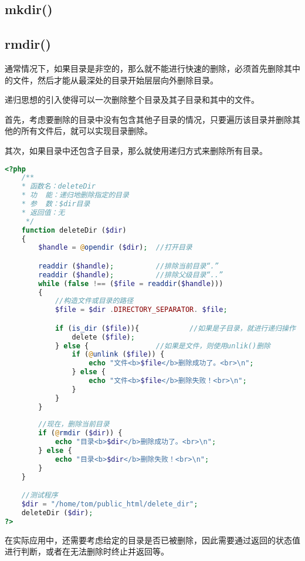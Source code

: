 \subsection{mkdir()}




\subsection{rmdir()}


通常情况下，如果目录是非空的，那么就不能进行快速的删除，必须首先删除其中的文件，然后才能从最深处的目录开始层层向外删除目录。


递归思想的引入使得可以一次删除整个目录及其子目录和其中的文件。


首先，考虑要删除的目录中没有包含其他子目录的情况，只要遍历该目录并删除其他的所有文件后，就可以实现目录删除。

其次，如果目录中还包含子目录，那么就使用递归方式来删除所有目录。



\begin{lstlisting}[language=PHP]
<?php
	/**
	* 函数名：deleteDir
	* 功  能：递归地删除指定的目录
	* 参  数：$dir目录
	* 返回值：无
     */
	function deleteDir ($dir)
	{
		$handle = @opendir ($dir);	//打开目录

		readdir ($handle);			//排除当前目录“.”
		readdir ($handle);			//排除父级目录“..”
		while (false !== ($file = readdir($handle))) 
		{
			//构造文件或目录的路径
			$file = $dir .DIRECTORY_SEPARATOR. $file;

			if (is_dir ($file)){			//如果是子目录，就进行递归操作
				delete ($file);
			} else {				//如果是文件，则使用unlik()删除
				if (@unlink ($file)) {
					echo "文件<b>$file</b>删除成功了。<br>\n";
				} else {
					echo "文件<b>$file</b>删除失败！<br>\n";
				}
			}
		}
		
		//现在，删除当前目录
		if (@rmdir ($dir)) {
			echo "目录<b>$dir</b>删除成功了。<br>\n";
		} else {
			echo "目录<b>$dir</b>删除失败！<br>\n";
		}
	}

	//测试程序
	$dir = "/home/tom/public_html/delete_dir";
	deleteDir ($dir);
?>
\end{lstlisting}


在实际应用中，还需要考虑给定的目录是否已被删除，因此需要通过返回的状态值进行判断，或者在无法删除时终止并返回等。


\begin{lstlisting}[language=PHP]

\end{lstlisting}

